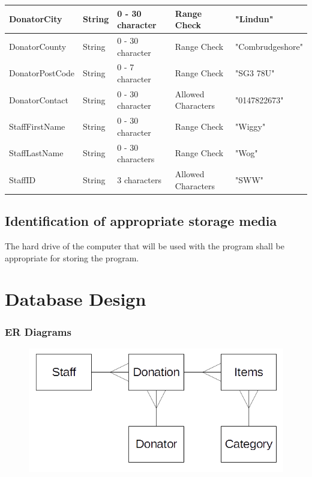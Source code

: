 \begin{tabular}{|p{3.25cm}|p{1.5cm}|p{1.75cm}|p{3cm}|p{3.5cm}|}
	{DonatorCity} & {String} & {0 - 30 character} & {Range Check} & {"Lindun"} \\ \hline
	{DonatorCounty} & {String} & {0 - 30 character} & {Range Check} & {"Combrudgeshore"} \\ \hline
	{DonatorPostCode} & {String} & {0 - 7 character} & {Range Check} & {"SG3 78U"} \\ \hline
	{DonatorContact} & {String} & {0 - 30 character} & {Allowed Characters} & {"0147822673"} \\ \hline
	{StaffFirstName} & {String} & {0 - 30 character} & {Range Check} & {"Wiggy"} \\ \hline
	{StaffLastName} & {String} & {0 - 30 characters} & {Range Check} & {"Wog"} \\ \hline
	{StaffID} & {String} & {3 characters} & {Allowed Characters} & {"SWW"} \\ \hline
\end{tabular}


\subsection{Identification of appropriate storage media}
The hard drive of the computer that will be used with the program shall be appropriate for storing the program.

\section{Database Design}


\subsubsection{ER Diagrams}

\begin{figure}[H]
    \includegraphics[width=\textwidth]{./Design/Images/ERDiagram.png}
\end{figure}


